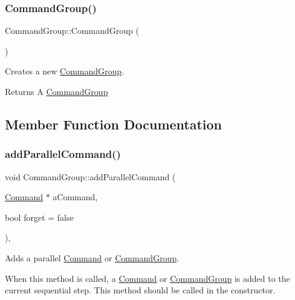 \subsubsection{\texorpdfstring{CommandGroup()}{CommandGroup()}}
{\footnotesize\ttfamily Command\+Group\+::\+Command\+Group (\begin{DoxyParamCaption}{ }\end{DoxyParamCaption})}



Creates a new \mbox{\hyperlink{classlib_iterative_robot_1_1_command_group}{Command\+Group}}. 

\begin{DoxyReturn}{Returns}
A \mbox{\hyperlink{classlib_iterative_robot_1_1_command_group}{Command\+Group}} 
\end{DoxyReturn}


\subsection{Member Function Documentation}
\mbox{\label{classlib_iterative_robot_1_1_command_group_a7255a0b640e74ce74870939b45d23a58}} 
\subsubsection{\texorpdfstring{addParallelCommand()}{addParallelCommand()}}
{\footnotesize\ttfamily void Command\+Group\+::add\+Parallel\+Command (\begin{DoxyParamCaption}\item[{\mbox{\hyperlink{classlib_iterative_robot_1_1_command}{Command}} $\ast$}]{a\+Command,  }\item[{bool}]{forget = {\ttfamily false} }\end{DoxyParamCaption})\hspace{0.3cm}{\ttfamily [protected]}, {\ttfamily [virtual]}}



Adds a parallel \mbox{\hyperlink{classlib_iterative_robot_1_1_command}{Command}} or \mbox{\hyperlink{classlib_iterative_robot_1_1_command_group}{Command\+Group}}. 

When this method is called, a \mbox{\hyperlink{classlib_iterative_robot_1_1_command}{Command}} or \mbox{\hyperlink{classlib_iterative_robot_1_1_command_group}{Command\+Group}} is added to the current sequential step. This method should be called in the constructor.


